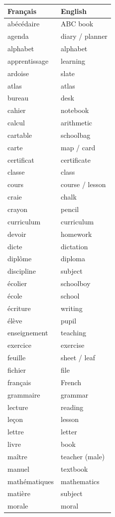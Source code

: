 \documentclass[12pt,a4paper]{article}
\begin{document}
\begin{longtable}{p{4cm} p{6cm}}
\toprule
\textbf{Français} & \textbf{English} \\
\midrule
abécédaire & ABC book \\
agenda & diary / planner \\
alphabet & alphabet \\
apprentissage & learning \\
ardoise & slate \\
atlas & atlas \\
bureau & desk \\
cahier & notebook \\
calcul & arithmetic \\
cartable & schoolbag \\
carte & map / card \\
certificat & certificate \\
classe & class \\
cours & course / lesson \\
craie & chalk \\
crayon & pencil \\
curriculum & curriculum \\
devoir & homework \\
dicte & dictation \\
diplôme & diploma \\
discipline & subject \\
écolier & schoolboy \\
école & school \\
écriture & writing \\
élève & pupil \\
enseignement & teaching \\
exercice & exercise \\
feuille & sheet / leaf \\
fichier & file \\
français & French \\
grammaire & grammar \\
lecture & reading \\
leçon & lesson \\
lettre & letter \\
livre & book \\
maître & teacher (male) \\
manuel & textbook \\
mathématiques & mathematics \\
matière & subject \\
morale & moral \\

\end{longtable}
\end{document}
